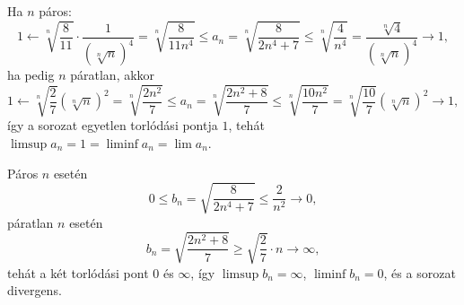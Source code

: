 \documentclass[11pt]{scrartcl}
\begin{document}
Ha $n$ páros:
\[
	1
	\leftarrow \sqrt[n]{\frac{8}{11}} \cdot \frac{1}{\left(\sqrt[n]{n}\right)^4}
	= \sqrt[n]{\frac{8}{11n^4}}
	\le a_n
	= \sqrt[n]{\frac{8}{2n^4 + 7}}
	\le \sqrt[n]{\frac{4}{n^4}}
	= \frac{\sqrt[n]{4}}{\left(\sqrt[n]{n}\right)^4}
	\to 1,
\]
ha pedig $n$ páratlan, akkor
\[
	1
	\leftarrow \sqrt[n]{\frac{2}{7}} \left(\sqrt[n]{n}\right)^2
	= \sqrt[n]{\frac{2n^2}{7}}
	\le a_n
	= \sqrt[n]{\frac{2n^2 + 8}{7}}
	\le \sqrt[n]{\frac{10n^2}{7}}
	= \sqrt[n]{\frac{10}{7}} \left(\sqrt[n]{n}\right)^2
	\to 1,
\]
így a sorozat egyetlen torlódási pontja $1$, tehát
$\limsup a_n = 1 = \liminf a_n = \lim a_n$.

Páros $n$ esetén
\[
	0 \le b_n = \sqrt{\frac{8}{2n^4 + 7}} \le \frac{2}{n^2} \to 0,
\]
páratlan $n$ esetén
\[
	b_n = \sqrt{\frac{2n^2 + 8}{7}} \ge \sqrt{\frac{2}{7}} \cdot n \to \infty,
\]
tehát a két torlódási pont $0$ és $\infty$, így $\limsup b_n = \infty$,
$\liminf b_n = 0$, és a sorozat divergens.
\end{document}
